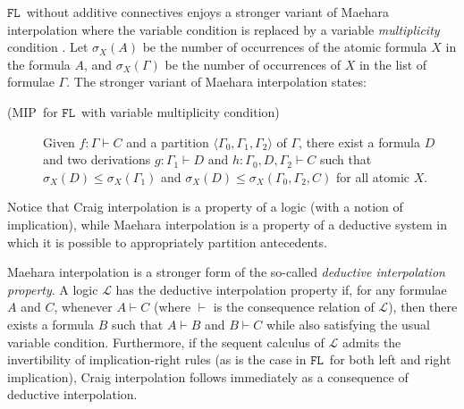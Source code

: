 \documentclass[sn-mathphys-num]{sn-jnl}%
\newcommand{\GG}{\Gamma}
\newcommand{\vd}{\vdash}
\newcommand{\mc}[1]{\mathcal{#1}}
\newcommand{\gs}[1]{\sigma_{X} (#1)}
\newcommand{\FL}{$\mathtt{FL}$}
\newcommand{\MIP}{\textsf{MIP}}
\theoremstyle{thmstyleone}%
\theoremstyle{thmstyletwo}%
\theoremstyle{thmstylethree}%
\begin{document}
\FL~without additive connectives enjoys a stronger variant of Maehara interpolation where the variable condition is replaced by a variable \emph{multiplicity} condition \cite{roorda1991,moot:categorial:2012}.
Let $\gs{A}$ be the number of occurrences of the atomic formula $X$ in the formula $A$, and $\gs{\GG}$ be the number of occurrences of $X$ in the list of formulae $\GG$.
The stronger variant of Maehara interpolation states:
\begin{description}
  \item[(\MIP~for \FL~with variable multiplicity condition)] Given $f : \GG \vdash C$ and a partition $\langle \GG_0, \GG_1, \GG_2 \rangle$ of $\GG$, there exist a formula $D$ and two derivations $g : \GG_1 \vdash D$ and $h : \GG_0, D, \GG_2 \vdash C$ such that $\gs{D} \leq \gs{\GG_1}$ and $\gs{D} \leq \gs{\GG_0, \GG_2 , C}$ for all atomic $X$.
\end{description}
Notice that Craig interpolation is a property of a logic (with a notion of implication), while Maehara interpolation is a property of a deductive system in which it is possible to appropriately partition antecedents.

Maehara interpolation is a stronger form of the so-called \emph{deductive interpolation property}. A logic $\mc{L}$ has the deductive interpolation property if, for any formulae $A$ and $C$, whenever $A \vd C$ (where $\vd$ is the consequence relation of $\mc{L}$), then there exists a formula $B$ such that $A \vd B$ and $B \vd C$ while also satisfying the usual variable condition. Furthermore, if the sequent calculus of $\mc{L}$ admits the invertibility of implication-right rules (as is the case in \FL\ for both left and right implication), Craig interpolation follows immediately as a consequence of deductive interpolation.
\end{document}

